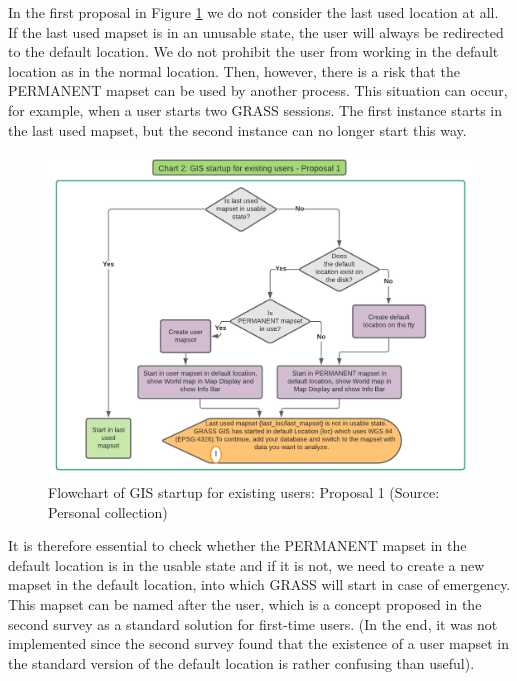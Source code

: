 \documentclass[a4paper,10pt,twoside]{article}
\begin{document}
\newpage
In the first proposal in Figure \ref{fig:normal_user_diagram} we do not consider the last used location at all. If the last used mapset is in an unusable state, the user will always be redirected to the default location. We do not prohibit the user from working in the default location as in the normal location. Then, however, there is a risk that the PERMANENT mapset can be used by another process. This situation can occur, for example, when a user starts two GRASS sessions. The first instance starts in the last used mapset, but the second instance can no longer start this way.

\vspace{0.3cm}
\begin{figure}[hbt!] 
\begin{center}
\includegraphics[width=16.5cm]{../pictures/normal_user_diagram.png} 
\caption[Flowchart of GIS startup for existing users: Proposal 1]{Flowchart of GIS startup for existing users: Proposal 1 (Source: Personal collection)}
\label{fig:normal_user_diagram}
\end{center}
\end{figure}

\noindent It is therefore essential to check whether the PERMANENT mapset in the default location is in the usable state and if it is not, we need to create a new mapset in the default location, into which GRASS will start in case of emergency. This mapset can be named after the user, which is a concept proposed in the second survey as a standard solution for first-time users. (In the end, it was not implemented since the second survey found that the existence of a user mapset in the standard version of the default location is rather confusing than useful).
\end{document}
